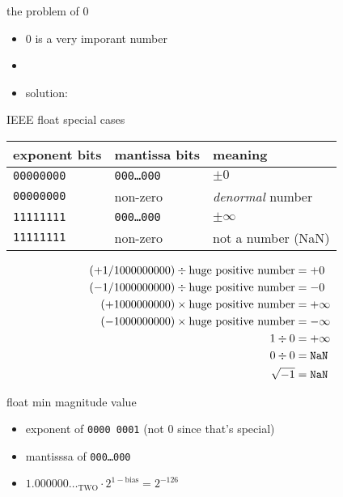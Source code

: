 \begin{frame}{the problem of 0}
\begin{itemize}
\item 0 is a very imporant number
\item {}
\vspace{.5cm}
\item solution: 
\end{itemize}
\end{frame}

\begin{frame}{IEEE float special cases}
\begin{tabular}{llp{5cm}}
exponent bits & mantissa bits & meaning \\ \hline
{\tt 00000000} & {\tt 000\ldots000} & $\pm 0$\\
{\tt 00000000} & non-zero & \textit{denormal} number \\
{\tt 11111111} & {\tt 000\ldots000} & $\pm \infty$ \\
{\tt 11111111} & non-zero & not a number (NaN) \\
\end{tabular}
\small
\begin{eqnarray*}
(+1/1000000000) \div \text{huge positive number} &= +0 \\
(-1/1000000000) \div \text{huge positive number} &= -0 \\
(+1000000000) \times \text{huge positive number} &= +\infty \\
(-1000000000) \times \text{huge positive number} &= -\infty \\
1 \div 0 &= +\infty \\
0 \div 0 &= \text{\tt NaN} \\ \sqrt{-1} &= \text{\tt NaN} \\
\end{eqnarray*}
\end{frame}

\begin{frame}{float min magnitude value}
\begin{itemize}
\item exponent of {\tt 0000 0001}  (not 0 since that's special)
\item mantisssa of {\tt 000\ldots000}
\item $1.000000\ldots_\text{TWO} \cdot 2^{1-\text{bias}} = 2^{-126}$
\end{itemize}
\end{frame}

